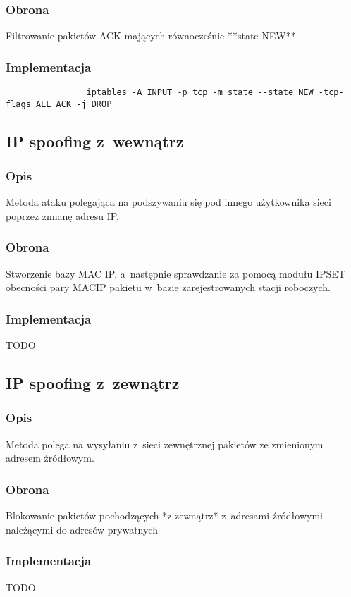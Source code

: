\documentclass[a4paper,10pt]{article}
\begin{document}
		\subsubsection{Obrona}
			Filtrowanie pakietów ACK mających równocześnie **state NEW**
		\subsubsection{Implementacja}
			\begin{verbatim}
				iptables -A INPUT -p tcp -m state --state NEW -tcp-flags ALL ACK -j DROP
			\end{verbatim}
	\subsection{IP spoofing z~wewnątrz}
		\subsubsection{Opis}
			Metoda ataku polegająca na podszywaniu się pod innego użytkownika sieci poprzez zmianę adresu IP.
		\subsubsection{Obrona}
			Stworzenie bazy MAC \dywiz IP, a~następnie sprawdzanie za pomocą modułu IPSET obecności pary MAC\dywiz IP pakietu w~bazie zarejestrowanych stacji roboczych.
		\subsubsection{Implementacja}
			TODO
	\subsection{IP spoofing z~zewnątrz}
		\subsubsection{Opis}
			Metoda polega na wysyłaniu z~sieci zewnętrznej pakietów ze zmienionym adresem źródłowym.
		\subsubsection{Obrona}
			Blokowanie pakietów pochodzących *z zewnątrz* z~adresami źródłowymi należącymi do adresów prywatnych
		\subsubsection{Implementacja}
			TODO
\end{document}
